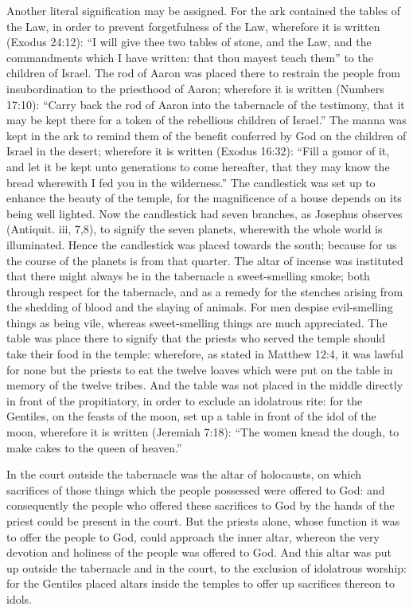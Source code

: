 Another literal signification may be assigned. For the ark contained the tables of the Law, in order to prevent forgetfulness of the Law, wherefore it is written (Exodus 24:12): ``I will give thee two tables of stone, and the Law, and the commandments which I have written: that thou mayest teach them'' to the children of Israel. The rod of Aaron was placed there to restrain the people from insubordination to the priesthood of Aaron; wherefore it is written (Numbers 17:10): ``Carry back the rod of Aaron into the tabernacle of the testimony, that it may be kept there for a token of the rebellious children of Israel.'' The manna was kept in the ark to remind them of the benefit conferred by God on the children of Israel in the desert; wherefore it is written (Exodus 16:32): ``Fill a gomor of it, and let it be kept unto generations to come hereafter, that they may know the bread wherewith I fed you in the wilderness.'' The candlestick was set up to enhance the beauty of the temple, for the magnificence of a house depends on its being well lighted. Now the candlestick had seven branches, as Josephus observes (Antiquit. iii, 7,8), to signify the seven planets, wherewith the whole world is illuminated. Hence the candlestick was placed towards the south; because for us the course of the planets is from that quarter. The altar of incense was instituted that there might always be in the tabernacle a sweet-smelling smoke; both through respect for the tabernacle, and as a remedy for the stenches arising from the shedding of blood and the slaying of animals. For men despise evil-smelling things as being vile, whereas sweet-smelling things are much appreciated. The table was place there to signify that the priests who served the temple should take their food in the temple: wherefore, as stated in Matthew 12:4, it was lawful for none but the priests to eat the twelve loaves which were put on the table in memory of the twelve tribes. And the table was not placed in the middle directly in front of the propitiatory, in order to exclude an idolatrous rite: for the Gentiles, on the feasts of the moon, set up a table in front of the idol of the moon, wherefore it is written (Jeremiah 7:18): ``The women knead the dough, to make cakes to the queen of heaven.''

In the court outside the tabernacle was the altar of holocausts, on which sacrifices of those things which the people possessed were offered to God: and consequently the people who offered these sacrifices to God by the hands of the priest could be present in the court. But the priests alone, whose function it was to offer the people to God, could approach the inner altar, whereon the very devotion and holiness of the people was offered to God. And this altar was put up outside the tabernacle and in the court, to the exclusion of idolatrous worship: for the Gentiles placed altars inside the temples to offer up sacrifices thereon to idols.

